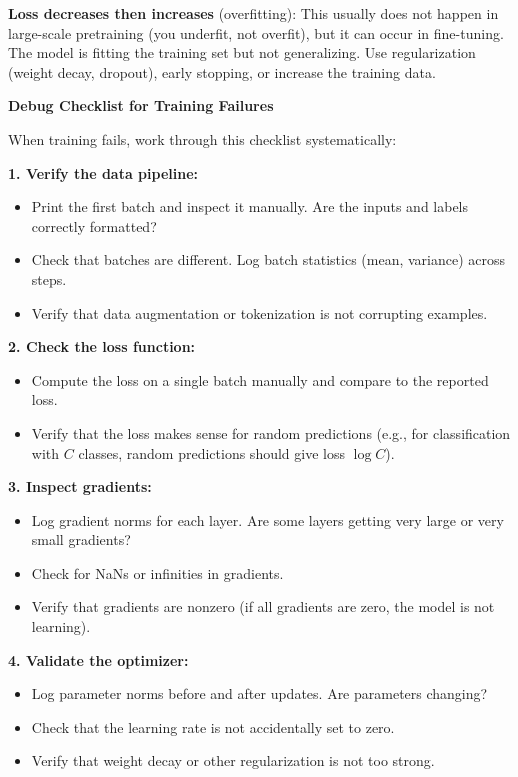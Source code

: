 \textbf{Loss decreases then increases} (overfitting): This usually does not happen in large-scale pretraining (you underfit, not overfit), but it can occur in fine-tuning. The model is fitting the training set but not generalizing. Use regularization (weight decay, dropout), early stopping, or increase the training data.

\vspace{1.5em}

\begin{examplebox}
\textbf{Debug Checklist for Training Failures}

\vspace{0.5em}

When training fails, work through this checklist systematically:

\vspace{0.5em}

\textbf{1. Verify the data pipeline:}
\begin{itemize}
\item Print the first batch and inspect it manually. Are the inputs and labels correctly formatted?
\item Check that batches are different. Log batch statistics (mean, variance) across steps.
\item Verify that data augmentation or tokenization is not corrupting examples.
\end{itemize}

\textbf{2. Check the loss function:}
\begin{itemize}
\item Compute the loss on a single batch manually and compare to the reported loss.
\item Verify that the loss makes sense for random predictions (e.g., for classification with $C$ classes, random predictions should give loss $\log C$).
\end{itemize}

\textbf{3. Inspect gradients:}
\begin{itemize}
\item Log gradient norms for each layer. Are some layers getting very large or very small gradients?
\item Check for NaNs or infinities in gradients.
\item Verify that gradients are nonzero (if all gradients are zero, the model is not learning).
\end{itemize}

\textbf{4. Validate the optimizer:}
\begin{itemize}
\item Log parameter norms before and after updates. Are parameters changing?
\item Check that the learning rate is not accidentally set to zero.
\item Verify that weight decay or other regularization is not too strong.
\end{itemize}


\end{examplebox}
